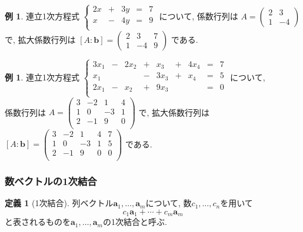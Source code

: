 \documentclass[dvipdfmx,a4paper,11pt]{article}
\theoremstyle{definition}
\newtheorem{dfn}[thm]{定義}
\newtheorem{exa}[thm]{例}
\begin{document}
 \begin{exa}
 連立1次方程式
 $
 \left\{ 
\begin{matrix}
2x&+&3y& = &7 \\
x&-&4y& = &9 \\
\end{matrix}
\right.
 $
 について, 係数行列は
 $A = 
 \begin{pmatrix}
 2 & 3 \\
 1 & -4
 \end{pmatrix}
 $
 で, 拡大係数行列は
 $[A : \bm{b}] = 
  \begin{pmatrix}
 2 & 3  &7\\
 1 & -4 &9
 \end{pmatrix}
 $
 である.
 \end{exa}
 
  \begin{exa}
 連立1次方程式
 $
 \left\{ 
\begin{matrix}
3x_1&-&2x_2& +& x_3 &+& 4x_4 &=& 7 \\
x_1 &  & 	   & -& 3x_3 &+& x_4 &=& 5 \\
2x_1&-& x_2& +& 9x_3 & & 	 &=& 0 \\
\end{matrix}
\right.
 $
 について, \\
 係数行列は
 $A = 
 \begin{pmatrix}
 3 & -2  & 1&4\\
 1 & 0   & -3&1\\
2 & -1  & 9&0\\
 \end{pmatrix}
 $
 で, 拡大係数行列は
 $[A : \bm{b}] = 
 \begin{pmatrix}
 3 & -2  & 1&4 & 7\\
 1 & 0   & -3&1 &5\\
2 & -1  & 9&0 & 0\\
 \end{pmatrix}
 $
 である.
 \end{exa}
 
 \subsubsection{数ベクトルの1次結合}
 
 
  \begin{tcolorbox}[
    colback = white,
    colframe = green!35!black,
    fonttitle = \bfseries,
    breakable = true]
    \begin{dfn}[1次結合]
列ベクトル$\bm{a}_1, \ldots, \bm{a}_{m}$について, 
数$c_1, \ldots, c_n$を用いて
$$
c_1\bm{a}_1 + \cdots + c_m\bm{a}_{m}
$$
と表されるものを$\bm{a}_1, \ldots, \bm{a}_{m}$の1次結合と呼ぶ.
  \end{dfn}
 \end{tcolorbox}
 
\end{document}
